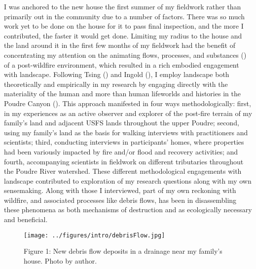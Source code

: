 \documentclass[
]{article}
\begin{document}
I was anchored to the new house the first summer of my fieldwork rather than primarily out in the community due to a number of factors. There was so much work yet to be done on the house for it to pass final inspection, and the more I contributed, the faster it would get done. Limiting my radius to the house and the land around it in the first few months of my fieldwork had the benefit of concentrating my attention on the animating flows, processes, and substances () of a post-wildfire environment, which resulted in a rich embodied engagement with landscape. Following Tsing () and Ingold (), I employ landscape both theoretically and empirically in my research by engaging directly with the materiality of the human and more than human lifeworlds and histories in the Poudre Canyon (). This approach manifested in four ways methodologically: first, in my experiences as an active observer and explorer of the post-fire terrain of my family's land and adjacent USFS lands throughout the upper Poudre; second, using my family's land as the basis for walking interviews with practitioners and scientists; third, conducting interviews in participants' homes, where properties had been variously impacted by fire and/or flood and recovery activities; and fourth, accompanying scientists in fieldwork on different tributaries throughout the Poudre River watershed. These different methodological engagements with landscape contributed to exploration of my research questions along with my own sensemaking. Along with those I interviewed, part of my own reckoning with wildfire, and associated processes like debris flows, has been in disassembling these phenomena as both mechanisms of destruction and as ecologically necessary and beneficial.

\begin{figure}
\centering
\texttt{[image: ../figures/intro/debrisFlow.jpg]}
\caption{Figure 1: New debris flow deposits in a drainage near my family's house. Photo by author.}
\end{figure}
\end{document}
